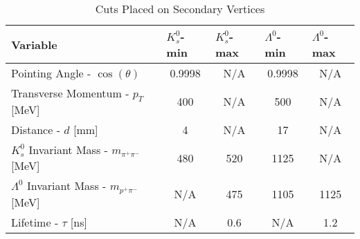 \documentclass{article}
\begin{document}
\begin{table}[h!]
\caption{Cuts Placed on Secondary Vertices}
\label{tab:my-table}
\centering
\begin{tabular}{lcccc}
\hline
\textbf{Variable}                    & \multicolumn{1}{l}{\textbf{$K_s^0$-min}} & \multicolumn{1}{l}{\textbf{$K_s^0$-max}} & \multicolumn{1}{l}{\textbf{$\Lambda^0$-min}} & \multicolumn{1}{l}{\textbf{$\Lambda^0$-max}} \\ \hline
Pointing Angle - $\cos(\theta)$                       & 0.9998                                                    & N/A                                                       & 0.9998                                                        & N/A                                                           \\
Transverse Momentum - $p_T$ [MeV]                 & 400                                                       & N/A                                                       & 500                                                           & N/A                                                           \\
Distance - $d$ [mm]                               & 4                                                         & N/A                                                       & 17                                                            & N/A                                                           \\
$K_s^0$ Invariant Mass - $m_{\pi^+\pi^-}$ [MeV]   & 480                                                       & 520                                                       & 1125                                                          & N/A                                                           \\
$\Lambda^0$ Invariant Mass - $m_{p^+\pi^-}$ [MeV] & N/A                                                       & 475                                                       & 1105                                                          & 1125                                                          \\ 
Lifetime - $\tau$ [ns]                            & N/A                                                       & 0.6                                                       & N/A                                                           & 1.2                                                           \\ \hline
\end{tabular}
\end{table}
\end{document}
